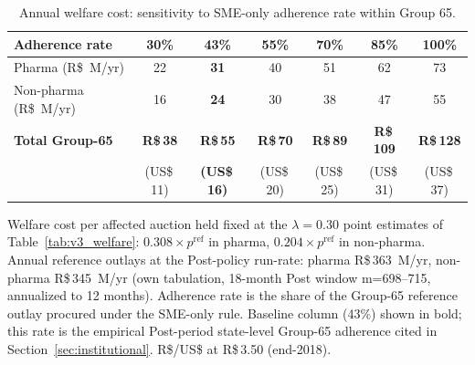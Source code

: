 \begin{table}[!htbp]
\centering
\begin{threeparttable}
\caption{Annual welfare cost: sensitivity to SME-only adherence rate within Group 65.}
\label{tab:welfare_adherence_sensitivity}
\small
\setlength{\tabcolsep}{4pt}
\begin{tabular}{lcccccc}
\toprule
Adherence rate & 30\% & \textbf{43\%} & 55\% & 70\% & 85\% & 100\% \\
\midrule
Pharma           (R\$~M/yr) & 22 & \textbf{31} & 40 & 51 & 62 & 73 \\
Non-pharma       (R\$~M/yr) & 16 & \textbf{24} & 30 & 38 & 47 & 55 \\
\addlinespace
\textbf{Total Group-65} & \textbf{R\$\,38} & \textbf{R\$\,55} & \textbf{R\$\,70} & \textbf{R\$\,89} & \textbf{R\$\,109} & \textbf{R\$\,128} \\
 & (US\$\,11) & \textbf{(US\$\,16)} & (US\$\,20) & (US\$\,25) & (US\$\,31) & (US\$\,37) \\
\bottomrule
\end{tabular}
\begin{tablenotes}\footnotesize
\item Welfare cost per affected auction held fixed at the $\lambda = 0.30$ point estimates of Table~\ref{tab:v3_welfare}: $0.308 \times p^{\mathrm{ref}}$ in pharma, $0.204 \times p^{\mathrm{ref}}$ in non-pharma. Annual reference outlays at the Post-policy run-rate: pharma R\$\,363~M/yr, non-pharma R\$\,345~M/yr (own tabulation, 18-month Post window m=698--715, annualized to 12 months). Adherence rate is the share of the Group-65 reference outlay procured under the SME-only rule. Baseline column (43\%) shown in bold; this rate is the empirical Post-period state-level Group-65 adherence cited in Section~\ref{sec:institutional}. R\$/US\$ at R\$\,3.50 (end-2018).
\end{tablenotes}
\end{threeparttable}
\end{table}
